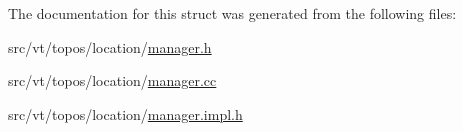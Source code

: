 The documentation for this struct was generated from the following files\+:\begin{DoxyCompactItemize}
\item 
src/vt/topos/location/\hyperlink{topos_2location_2manager_8h}{manager.\+h}\item 
src/vt/topos/location/\hyperlink{topos_2location_2manager_8cc}{manager.\+cc}\item 
src/vt/topos/location/\hyperlink{topos_2location_2manager_8impl_8h}{manager.\+impl.\+h}\end{DoxyCompactItemize}
